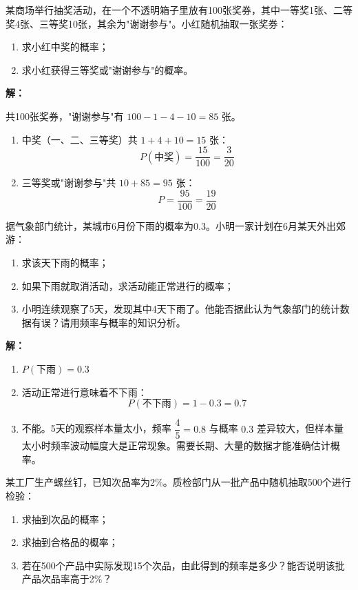 \documentclass[12pt, a4paper]{ctexart}
\begin{document}
\begin{appbox}[【应用1】商场抽奖活动]
某商场举行抽奖活动，在一个不透明箱子里放有100张奖券，其中一等奖1张、二等奖4张、三等奖10张，其余为"谢谢参与"。小红随机抽取一张奖券：
\begin{enumerate}[label=(\arabic*)]
  \item 求小红中奖的概率；
  \item 求小红获得三等奖或"谢谢参与"的概率。
\end{enumerate}
\end{appbox}

\textbf{解：}

共100张奖券，"谢谢参与"有 $100 - 1 - 4 - 10 = 85$ 张。
\begin{enumerate}[label=(\arabic*)]
  \item 中奖（一、二、三等奖）共 $1 + 4 + 10 = 15$ 张：
  \[
    P(\text{中奖}) = \frac{15}{100} = \frac{3}{20}
  \]
  \item 三等奖或"谢谢参与"共 $10 + 85 = 95$ 张：
  \[
    P = \frac{95}{100} = \frac{19}{20}
  \]
\end{enumerate}

\begin{appbox}[【应用2】天气预报与决策]
据气象部门统计，某城市6月份下雨的概率为0.3。小明一家计划在6月某天外出郊游：
\begin{enumerate}[label=(\arabic*)]
  \item 求该天下雨的概率；
  \item 如果下雨就取消活动，求活动能正常进行的概率；
  \item 小明连续观察了5天，发现其中4天下雨了。他能否据此认为气象部门的统计数据有误？请用频率与概率的知识分析。
\end{enumerate}
\end{appbox}

\textbf{解：}
\begin{enumerate}[label=(\arabic*)]
  \item $P(\text{下雨}) = 0.3$

  \item 活动正常进行意味着不下雨：
  \[
    P(\text{不下雨}) = 1 - 0.3 = 0.7
  \]

  \item 不能。5天的观察样本量太小，频率 $\dfrac{4}{5} = 0.8$ 与概率 $0.3$ 差异较大，但样本量太小时频率波动幅度大是正常现象。需要长期、大量的数据才能准确估计概率。
\end{enumerate}

\begin{appbox}[【应用3】质量检测]
某工厂生产螺丝钉，已知次品率为2\%。质检部门从一批产品中随机抽取500个进行检验：
\begin{enumerate}[label=(\arabic*)]
  \item 求抽到次品的概率；
  \item 求抽到合格品的概率；
  \item 若在500个产品中实际发现15个次品，由此得到的频率是多少？能否说明该批产品次品率高于2\%？
\end{enumerate}
\end{appbox}
\end{document}

